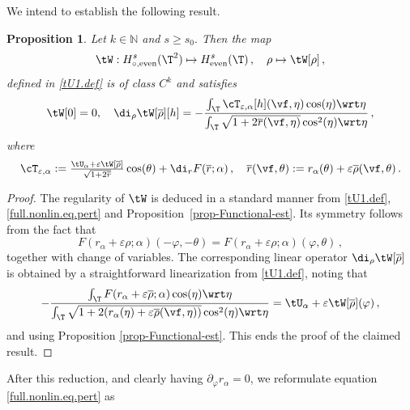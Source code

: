 \documentclass[a4paper,reqno,10pt]{article}
\newtheorem{pro}{Proposition}[section]
\begin{document}
We intend to establish  the following result.
\begin{pro}\label{prop.U1}
	Let $k\in\mathbb{N}$ and $s\geqslant s_0.$  Then the map
	\begin{equation}
		\tW:  H_{\circ,\textnormal{even}}^s(\T^2) \mapsto H^s_\textnormal{even}(\T)\,, \quad  \rho \mapsto \tW[\rho]\,,
	\end{equation}
	defined in \eqref{tU1.def} is of class $C^k$ and satisfies
	\begin{equation}\label{U10}
		\tW[0] = 0,\quad
		\di_{\rho} \tW[\overline \rho][h] = - \frac{\int_{\T} \cT_{\varepsilon,\alpha}[h](\vf,\eta) \cos(\eta) \wrt\eta }{ \int_{\T} \sqrt{1+ 2\overline{r}(\vf,\eta)} \cos^2(\eta) \wrt\eta} \,,
	\end{equation}
	where
	\begin{equation}
		\cT_{\varepsilon,\alpha} := \tfrac{\tU_{\alpha}+\varepsilon \tW[\overline\rho]}{\sqrt{1+ 2 \overline{r}}} \cos(\theta)+ \di_{r} F(\overline{r};\alpha) \,, \quad  \overline{r}(\vf,\theta):= r_\alpha(\theta) + \varepsilon \overline{\rho}(\vf,\theta) \,.
	\end{equation}
\end{pro}
\begin{proof}
   The regularity of $\tW$ is deduced in a standard manner from \eqref{tU1.def}, \eqref{full.nonlin.eq.pert} and \mbox{Proposition \ref{prop-Functional-est}}. Its symmetry follows from the fact that
   $$
   F(r_\alpha+\varepsilon\rho;\alpha)(-\varphi,-\theta)=F(r_\alpha+\varepsilon\rho;\alpha)(\varphi,\theta)\,,
   $$
   together with change of variables.
   The corresponding linear operator $\di_{\rho}\tW[\overline \rho]$ is obtained by a straightforward linearization
   from \eqref{tU1.def}, noting that
    \begin{equation}
        - \frac{\int_{\T} F(r_\alpha+\varepsilon \overline \rho;\alpha) \cos(\eta) \wrt\eta}{\int_{\T}\sqrt{1+2 (r_\alpha(\eta) +\varepsilon \overline \rho(\vf,\eta))} \cos^2(\eta) \wrt\eta} = \tU_{\alpha} +\varepsilon \tW[\overline \rho](\varphi)\,,
    \end{equation}
and using Proposition \ref{prop-Functional-est}. This ends the proof of the claimed result.
 \end{proof}
After this reduction, and clearly having $\partial_\varphi r_\alpha=0$, we reformulate equation \eqref{full.nonlin.eq.pert} as
\end{document}
